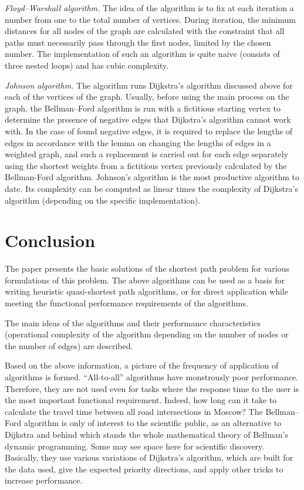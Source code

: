     \textit{Floyd--Warshall algorithm.}
    The idea of the algorithm is to fix at each iteration a number from one to the total number of vertices.
    During iteration, the minimum distances for all nodes of the graph are calculated with the constraint that all paths must necessarily pass through the first nodes, limited by the chosen number.
    The implementation of such an algorithm is quite naive (consists of three nested loops) and has cubic complexity.
    
    \textit{Johnson algorithm.}
    The algorithm runs Dijkstra's algorithm discussed above for each of the vertices of the graph.
    Usually, before using the main process on the graph, the Bellman--Ford algorithm is run with a fictitious starting vertex to determine the presence of negative edges that Dijkstra's algorithm cannot work with.
    In the case of found negative edges, it is required to replace the lengths of edges in accordance with the lemma on changing the lengths of edges in a weighted graph, and such a replacement is carried out for each edge separately using the shortest weights from a fictitious vertex previously calculated by the Bellman-Ford algorithm.
    Johnson's algorithm is the most productive algorithm to date.
    Its complexity can be computed as linear times the complexity of Dijkstra's algorithm (depending on the specific implementation).
    
    
    \section{Conclusion}
    The paper presents the basic solutions of the shortest path problem for various formulations of this problem.
    The above algorithms can be used as a basis for writing heuristic quasi-shortest path algorithms, or for direct application while meeting the functional performance requirements of the algorithms.

    The main ideas of the algorithms and their performance characteristics (operational complexity of the algorithm depending on the number of nodes or the number of edges) are described.
    
    Based on the above information, a picture of the frequency of application of algorithms is formed.
    ``All-to-all'' algorithms have monstrously poor performance.
    Therefore, they are not used even for tasks where the response time to the user is the most important functional requirement.
    Indeed, how long can it take to calculate the travel time between all road intersections in Moscow?
    The Bellman--Ford algorithm is only of interest to the scientific public, as an alternative to Dijkstra and behind which stands the whole mathematical theory of Bellman's dynamic programming.
    Some may see space here for scientific discovery.
    Basically, they use various variations of Dijkstra's algorithm, which are built for the data used, give the expected priority directions, and apply other tricks to increase performance.

